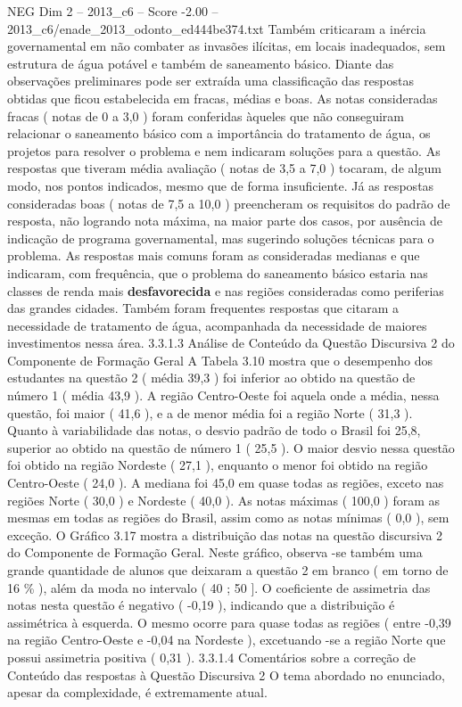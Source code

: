 \begin{textsample}{NEG Dim 2 – 2013\_c6 – Score -2.00 – 2013\_c6/enade\_2013\_odonto\_ed444be374.txt}
Também criticaram a inércia governamental em não combater as invasões ilícitas, em locais inadequados, sem estrutura de água potável e também de saneamento básico.
Diante das observações preliminares pode ser extraída uma classificação das respostas obtidas que ficou estabelecida em fracas, médias e boas.
As notas consideradas fracas ( notas de 0 a 3,0 ) foram conferidas àqueles que não conseguiram relacionar o saneamento básico com a importância do tratamento de água, os projetos para resolver o problema e nem indicaram soluções para a questão.
As respostas que tiveram média avaliação ( notas de 3,5 a 7,0 ) tocaram, de algum modo, nos pontos indicados, mesmo que de forma insuficiente.
Já as respostas consideradas boas ( notas de 7,5 a 10,0 ) preencheram os requisitos do padrão de resposta, não logrando nota máxima, na maior parte dos casos, por ausência de indicação de programa governamental, mas sugerindo soluções técnicas para o problema.
As respostas mais comuns foram as consideradas medianas e que indicaram, com frequência, que o problema do saneamento básico estaria nas classes de renda mais \textbf{desfavorecida} e nas regiões consideradas como periferias das grandes cidades.
Também foram frequentes respostas que citaram a necessidade de tratamento de água, acompanhada da necessidade de maiores investimentos nessa área. 3.3.1.3 Análise de Conteúdo da Questão Discursiva 2 do Componente de Formação Geral A Tabela 3.10 mostra que o desempenho dos estudantes na questão 2 ( média 39,3 ) foi inferior ao obtido na questão de número 1 ( média 43,9 ).
A região Centro-Oeste foi aquela onde a média, nessa questão, foi maior ( 41,6 ), e a de menor média foi a região Norte ( 31,3 ).
Quanto à variabilidade das notas, o desvio padrão de todo o Brasil foi 25,8, superior ao obtido na questão de número 1 ( 25,5 ).
O maior desvio nessa questão foi obtido na região Nordeste ( 27,1 ), enquanto o menor foi obtido na região Centro-Oeste ( 24,0 ).
A mediana foi 45,0 em quase todas as regiões, exceto nas regiões Norte ( 30,0 ) e Nordeste ( 40,0 ).
As notas máximas ( 100,0 ) foram as mesmas em todas as regiões do Brasil, assim como as notas mínimas ( 0,0 ), sem exceção.
O Gráfico 3.17 mostra a distribuição das notas na questão discursiva 2 do Componente de Formação Geral.
Neste gráfico, observa -se também uma grande quantidade de alunos que deixaram a questão 2 em branco ( em torno de 16 \% ), além da moda no intervalo ( 40 ; 50 ].
O coeficiente de assimetria das notas nesta questão é negativo ( -0,19 ), indicando que a distribuição é assimétrica à esquerda.
O mesmo ocorre para quase todas as regiões ( entre -0,39 na região Centro-Oeste e -0,04 na Nordeste ), excetuando -se a região Norte que possui assimetria positiva ( 0,31 ). 3.3.1.4 Comentários sobre a correção de Conteúdo das respostas à Questão Discursiva 2 O tema abordado no enunciado, apesar da complexidade, é extremamente atual.

\end{textsample}

